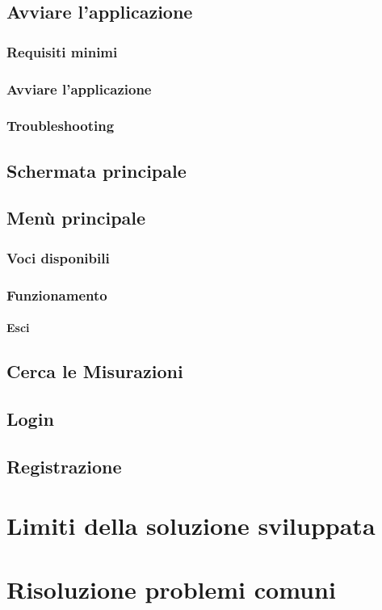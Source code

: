 \documentclass[12pt]{scrreprt}
\begin{document}
	\newpage

	\section{Avviare l'applicazione}

		\subsection{Requisiti minimi}

		\subsection{Avviare l'applicazione}

		\subsection{Troubleshooting}

	\section{Schermata principale}

	\section{Menù principale}
	\subsection{Voci disponibili}
	\subsection{Funzionamento}
			\subsubsection{Esci}

	\section{Cerca le Misurazioni}
	\section{Login}
	\section{Registrazione}

	\chapter{Limiti della soluzione sviluppata}
	\chapter{Risoluzione problemi comuni}

	\nocite{IuriTex}
	
	
	\printindex
\end{document}
